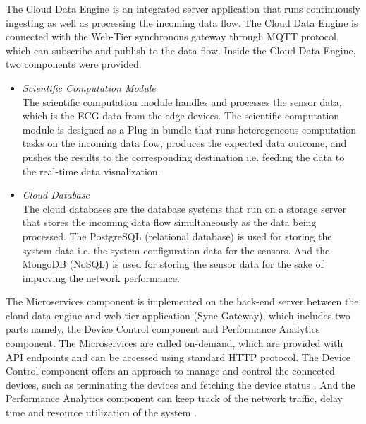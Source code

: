 \documentclass[conference]{IEEEtran}
\begin{document}
The Cloud Data Engine is an integrated server application that runs continuously ingesting as well as processing the incoming data flow. The Cloud Data Engine is connected with the Web-Tier synchronous gateway through MQTT protocol, which can subscribe and publish to the data flow. Inside the Cloud Data Engine, two components were provided. 

\begin{itemize}
	\item \textit{Scientific Computation Module}\\
	The scientific computation module handles and processes the sensor data, which is the ECG data from the edge devices. The scientific computation module is designed as a Plug-in bundle that runs heterogeneous computation tasks on the incoming data flow, produces the expected data outcome, and pushes the results to the corresponding destination i.e. feeding the data to the real-time data visualization.

	\item \textit{Cloud Database}\\
	The cloud databases are the database systems that run on a storage server that stores the incoming data flow simultaneously as the data being processed. The PostgreSQL (relational database) is used for storing the system data i.e. the system configuration data for the sensors. And the MongoDB (NoSQL) is used for storing the sensor data for the sake of improving the network performance.

\end{itemize}

The Microservices component is implemented on the back-end server between the cloud data engine and web-tier application (Sync Gateway), which includes two parts namely, the Device Control component and Performance Analytics component. The Microservices are called on-demand, which are provided with API endpoints and can be accessed using standard HTTP protocol. The Device Control component offers an approach to manage and control the connected devices, such as terminating the devices and fetching the device status \cite{b10}. And the Performance Analytics component can keep track of the network traffic, delay time and resource utilization of the system \cite{b11}.

\end{document}
